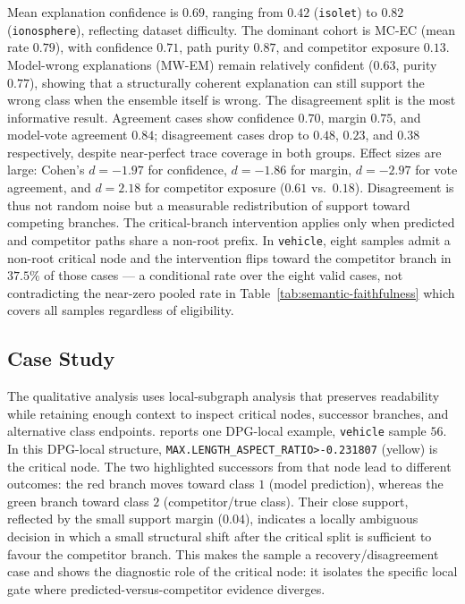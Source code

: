 \documentclass[runningheads]{llncs}
\begin{document}
Mean explanation confidence is $0.69$, ranging from $0.42$ (\texttt{isolet}) to $0.82$ (\texttt{ionosphere}), reflecting dataset difficulty. The dominant cohort is MC-EC (mean rate $0.79$), with confidence $0.71$, path purity $0.87$, and competitor exposure $0.13$. Model-wrong explanations (MW-EM) remain relatively confident ($0.63$, purity $0.77$), showing that a structurally coherent explanation can still support the wrong class when the ensemble itself is wrong.
The disagreement split is the most informative result. Agreement cases show confidence $0.70$, margin $0.75$, and model-vote agreement $0.84$; disagreement cases drop to $0.48$, $0.23$, and $0.38$ respectively, despite near-perfect trace coverage in both groups. Effect sizes are large: Cohen's $d=-1.97$ for confidence, $d=-1.86$ for margin, $d=-2.97$ for vote agreement, and $d=2.18$ for competitor exposure ($0.61$ vs.\ $0.18$). Disagreement is thus not random noise but a measurable redistribution of support toward competing branches.
The critical-branch intervention applies only when predicted and competitor paths share a non-root prefix. In \texttt{vehicle}, eight samples admit a non-root critical node and the intervention flips toward the competitor branch in $37.5\%$ of those cases --- a conditional rate over the eight valid cases, not contradicting the near-zero pooled rate in Table~\ref{tab:semantic-faithfulness} which covers all samples regardless of eligibility.

\subsection{Case Study}
The qualitative analysis uses local-subgraph analysis that preserves readability while retaining enough context to inspect critical nodes, successor branches, and alternative class endpoints.  reports one DPG-local example, \texttt{vehicle} sample $56$. In this DPG-local structure,  \texttt{MAX.LENGTH\_ASPECT\_RATIO>-0.231807} (yellow) is the critical node. The two highlighted successors from that node lead to different outcomes: the red branch moves toward class $1$ (model prediction), whereas the green branch toward class $2$ (competitor/true class). Their close support, reflected by the small support margin ($0.04$), indicates a locally ambiguous decision in which a small structural shift after the critical split is sufficient to favour the competitor branch. This makes the sample a recovery/disagreement case and shows the diagnostic role of the critical node: it isolates the specific local gate where predicted-versus-competitor evidence diverges.
\end{document}
